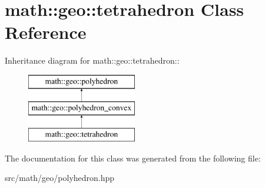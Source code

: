\hypertarget{classmath_1_1geo_1_1tetrahedron}{
\section{math::geo::tetrahedron Class Reference}
\label{classmath_1_1geo_1_1tetrahedron}
}
Inheritance diagram for math::geo::tetrahedron::\begin{figure}[H]
\begin{center}
\leavevmode
\includegraphics[height=3cm]{classmath_1_1geo_1_1tetrahedron}
\end{center}
\end{figure}


The documentation for this class was generated from the following file:\begin{DoxyCompactItemize}
\item 
src/math/geo/polyhedron.hpp\end{DoxyCompactItemize}
